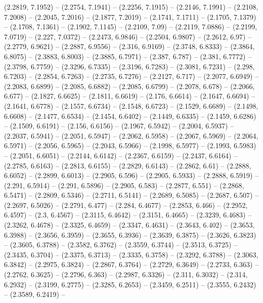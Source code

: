 {  (2.2819, 7.1952) -- (2.2754, 7.1941) -- (2.2256, 7.1915) -- (2.2146, 7.1991) 
  -- (2.2108, 7.2008) -- (2.2045, 7.2016) -- (2.1877, 7.2019) -- (2.1741, 
  7.1711) -- (2.1705, 7.1379) -- (2.1708, 7.1361) -- (2.1902, 7.1145) -- 
  (2.2109, 7.09) -- (2.2119, 7.0886) -- (2.2199, 7.0719) -- (2.227, 7.0372) -- 
  (2.2473, 6.9846) -- (2.2504, 6.9807) -- (2.2612, 6.97) -- (2.2779, 6.9621) -- 
  (2.2887, 6.9556) -- (2.316, 6.9169) -- (2.3748, 6.8333) -- (2.3864, 6.8075) --
   (2.3883, 6.8003) -- (2.3885, 6.7971) -- (2.387, 6.787) -- (2.381, 6.7772) -- 
  (2.3798, 6.7759) -- (2.3296, 6.7335) -- (2.3196, 6.7283) -- (2.3081, 6.7231) 
  -- (2.298, 6.7203) -- (2.2854, 6.7263) -- (2.2735, 6.7276) -- (2.2127, 6.717) 
  -- (2.2077, 6.6949) -- (2.2083, 6.6899) -- (2.2085, 6.6882) -- (2.2085, 
  6.6799) -- (2.2078, 6.678) -- (2.2066, 6.677) -- (2.1827, 6.6625) -- (2.1811, 
  6.6619) -- (2.176, 6.6614) -- (2.1647, 6.6694) -- (2.1641, 6.6778) -- (2.1557,
   6.6734) -- (2.1548, 6.6723) -- (2.1529, 6.6689) -- (2.1498, 6.6608) -- 
  (2.1477, 6.6534) -- (2.1454, 6.6402) -- (2.1449, 6.6335) -- (2.1459, 6.6286) 
  -- (2.1509, 6.6191) -- (2.156, 6.6156) -- (2.1967, 6.5942) -- (2.2004, 6.5937)
   -- (2.2037, 6.5941) -- (2.2051, 6.5947) -- (2.2062, 6.5958) -- (2.2067, 
  6.5969) -- (2.2064, 6.5971) -- (2.2056, 6.5965) -- (2.2043, 6.5966) -- 
  (2.1998, 6.5977) -- (2.1993, 6.5983) -- (2.2051, 6.6051) -- (2.2144, 6.6142) 
  -- (2.2367, 6.6159) -- (2.2437, 6.6164) -- (2.2785, 6.6163) -- (2.2813, 
  6.6155) -- (2.2829, 6.6143) -- (2.2862, 6.61) -- (2.2888, 6.6052) -- (2.2899, 
  6.6013) -- (2.2905, 6.596) -- (2.2905, 6.5933) -- (2.2888, 6.5919) -- (2.291, 
  6.5914) -- (2.291, 6.5896) -- (2.2905, 6.583) -- (2.2877, 6.551) -- (2.2868, 
  6.5471) -- (2.2809, 6.5346) -- (2.2711, 6.5141) -- (2.2689, 6.5085) -- 
  (2.2687, 6.507) -- (2.2697, 6.5026) -- (2.2791, 6.477) -- (2.284, 6.4677) -- 
  (2.2853, 6.466) -- (2.2952, 6.4597) -- (2.3, 6.4567) -- (2.3115, 6.4642) -- 
  (2.3151, 6.4665) -- (2.3239, 6.4683) -- (2.3262, 6.4678) -- (2.3325, 6.4659) 
  -- (2.3347, 6.4631) -- (2.3643, 6.402) -- (2.3653, 6.3988) -- (2.3656, 6.3959)
   -- (2.3655, 6.3936) -- (2.3639, 6.3875) -- (2.3626, 6.3823) -- (2.3605, 
  6.3788) -- (2.3582, 6.3762) -- (2.3559, 6.3744) -- (2.3513, 6.3725) -- 
  (2.3435, 6.3704) -- (2.3375, 6.3713) -- (2.3335, 6.3758) -- (2.3292, 6.3788) 
  -- (2.3063, 6.3842) -- (2.2975, 6.3824) -- (2.2867, 6.3764) -- (2.2729, 
  6.3649) -- (2.2733, 6.363) -- (2.2762, 6.3625) -- (2.2796, 6.363) -- (2.2987, 
  6.3326) -- (2.311, 6.3032) -- (2.314, 6.2932) -- (2.3199, 6.2775) -- (2.3285, 
  6.2653) -- (2.3459, 6.2511) -- (2.3555, 6.2432) -- (2.3589, 6.2419) -- 
}
